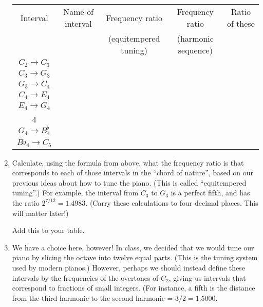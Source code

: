 \documentclass[12pt]{article}
\begin{document}
\begin{enumerate}
	    \small
	  \begin{tabular}{| c | c | c | c | c |}
	    \hline
	    Interval            & Name of interval & Frequency ratio & Frequency ratio                     & Ratio of these                               \\
	                        &                  &(equitempered tuning) &                 (harmonic sequence) &            \\
	    \hline
	    $C_2 \rightarrow C_3$ &      &                            &                                     &                                  \\
	    \hline
	    $C_3 \rightarrow G_3$ &      &                            &                                     &                                  \\
	    \hline
	    $G_3 \rightarrow C_4$ &      &                            &                                     &                                  \\
	    \hline
	    $C_4 \rightarrow E_4$ &      &                            &                                     &                                  \\
	    \hline
	    $E_4 \rightarrow G_4$ &      &                            &                                     &                                  \\
	    \hline4
	    $G_4 \rightarrow B^\flat_4$ &  &                                &                                     &                                  \\
	    \hline
	    $B\flat_4 \rightarrow C_5$ &  &                                &                                     &                                  \\
	    \hline
	  \end{tabular}


     \item Calculate, using the formula from above, what the frequency ratio is that corresponds to each of those intervals in the ``chord of nature'', based on our previous
       ideas about how to tune the piano. (This is called ``equitempered tuning''.)
       For example, the interval from $C_3$ to $G_3$ is a perfect fifth, and has the ratio $2^{7/12} = 1.4983$. (Carry these calculations to four decimal places. This will matter later!)

	Add this to your table.

     \item We have a choice here, however! In class, we decided that we would tune our piano by slicing the octave into twelve equal parts. 
       (This is the tuning system used by modern pianos.) However, perhaps we should instead define
       these intervals by the frequencies of the overtones of $C_2$, giving us intervals that correspond to fractions of small integers. (For instance, a fifth is the distance 
	from the third harmonic to the second harmonic = $3/2 = 1.5000$.


\end{enumerate}
\end{document}
